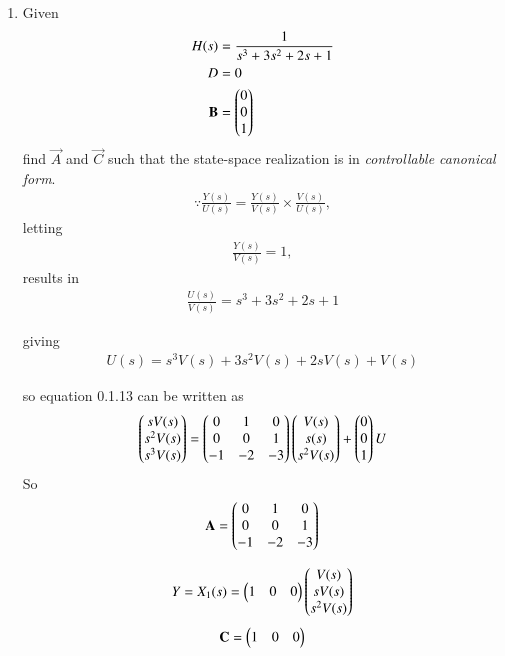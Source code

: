 \begin{enumerate}[label=\thesubsection.\arabic*.,ref=\thesubsection.\theenumi]
\item Given 
\begin{align}
H(s)&=\frac{1}{s^3+3s^2+2s+1}
\\
D&=0
\\
\mathbf{B}&= \begin{pmatrix}0\\0\\1\end{pmatrix}
\end{align}
%
 find $\vec{A}$ and $\vec{C}$ such that the state-space realization is in {\em controllable canonical form}.
\\
\solution 
\begin{align} 
\because {\frac{Y(s)}{U(s)}}= \frac{Y(s)}{V(s)} \times \frac{V(s)}{U(s)},
\end{align}
letting
\begin{align}
 {\frac{Y(s)}{V(s)}}= 1, 
\end{align}
results in 
\begin{align}
{\frac{U(s)}{V(s)}}={s^3 + 3s^2+2s + 1}
\end{align}

giving
\begin{align}
U(s)= s^3 V(s) + 3s^2 V(s)+2sV(s) + V(s)
\end{align}

so equation 0.1.13 can be written as
\begin{align}
\begin{pmatrix}sV(s)\\s^2V(s)\\s^3V(s)\end{pmatrix}
=
\begin{pmatrix}0&1&0\\0&0&1\\-1&-2&-3\end{pmatrix}\begin{pmatrix}V(s)\\s(s)\\s^2V(s)\end{pmatrix}
+
\begin{pmatrix}0\\0\\1\end{pmatrix}  U
\end{align}
So 
\begin{align}
\mathbf{A}=\begin{pmatrix}0&1&0\\0&0&1\\-1&-2&-3\end{pmatrix}
\end{align}

\begin{align}
Y=X_{1}(s)
=\begin{pmatrix}1&0&0\end{pmatrix} \begin{pmatrix}V(s)\\sV(s)\\s^2V(s)\end{pmatrix}
\end{align}
\begin{align}
\mathbf{C}=\begin{pmatrix}1&0&0\end{pmatrix}
\end{align}


\end{enumerate}
